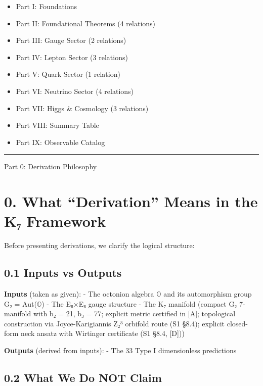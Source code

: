 \documentclass[11pt,a4paper]{article}
\begin{document}
\begin{itemize}
\tightlist
\item
  Part I: Foundations
\item
  Part II: Foundational Theorems (4 relations)
\item
  Part III: Gauge Sector (2 relations)
\item
  Part IV: Lepton Sector (3 relations)
\item
  Part V: Quark Sector (1 relation)
\item
  Part VI: Neutrino Sector (4 relations)
\item
  Part VII: Higgs \& Cosmology (3 relations)
\item
  Part VIII: Summary Table
\item
  Part IX: Observable Catalog
\end{itemize}

\begin{center}\rule{\linewidth}{0.5pt}\end{center}

Part 0: Derivation Philosophy

\section{0. What ``Derivation'' Means in the K₇ Framework}\label{what-derivation-means-in-the-kux2087-framework}

Before presenting derivations, we clarify the logical structure:

\subsection{0.1 Inputs vs Outputs}\label{inputs-vs-outputs}

\textbf{Inputs} (taken as given): - The octonion algebra \ensuremath{\mathbb{O}} and its automorphism group G₂ = Aut(\ensuremath{\mathbb{O}}) - The E₈×E₈ gauge structure - The K₇ manifold (compact G₂ 7-manifold with b₂ = 21, b₃ = 77; explicit metric certified in {[}A{]}; topological construction via Joyce-Karigiannis Z₂³ orbifold route (S1 §8.4); explicit closed-form neck ansatz with Wirtinger certificate (S1 §8.4, {[}D{]}))

\textbf{Outputs} (derived from inputs): - The 33 Type I dimensionless predictions

\subsection{0.2 What We Do NOT Claim}\label{what-we-do-not-claim}
\end{document}
